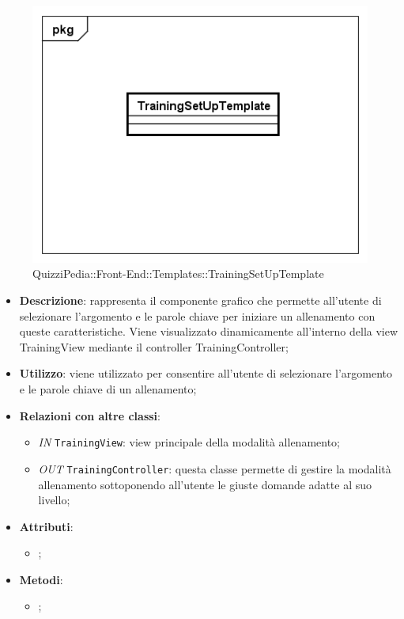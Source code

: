 		\begin{figure}[ht]
			\centering
			\includegraphics[scale=0.5,keepaspectratio]{UML/Classi/Front-End/QuizziPedia_Front-end_Templates_TrainingSetUpTemplate.png}
			\caption{QuizziPedia::Front-End::Templates::TrainingSetUpTemplate}
		\end{figure} \FloatBarrier
		
		\begin{itemize}
			\item \textbf{Descrizione}: rappresenta il componente grafico che permette all'utente di selezionare l'argomento e le parole chiave per iniziare un allenamento con queste caratteristiche. Viene visualizzato dinamicamente all'interno della view TrainingView mediante il controller TrainingController;
			\item \textbf{Utilizzo}: viene utilizzato per consentire all'utente di selezionare l'argomento e le parole chiave di un allenamento;
			\item \textbf{Relazioni con altre classi}: 
			\begin{itemize}
				\item \textit{IN} \texttt{TrainingView}: view principale della modalità allenamento; 
				\item \textit{OUT} \texttt{TrainingController}: questa classe permette di gestire la modalità allenamento sottoponendo all'utente le giuste domande adatte al suo livello;
			\end{itemize}
			\item \textbf{Attributi}: 
			\begin{itemize}
				\item ;
			\end{itemize}
			\item \textbf{Metodi}: 
			\begin{itemize}
				\item ;
			\end{itemize}
		\end{itemize}
		
